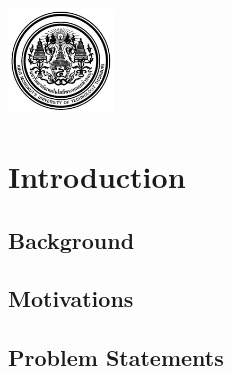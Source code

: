 \documentclass[12pt,oneside,openright,a4paper]{explo-english-project}
\begin{document}
\pdfstringdefDisableCommands{%
\let\MakeUppercase\relax
}
\begin{center}
  \includegraphics[width=2.8cm]{./assets/unilogo.jpg}
\end{center}
\vspace*{-1cm}

\maketitlepage





\tableofcontents   

\listoftables

\listoffigures                      










\chapter{Introduction}


\section{Background} 


\section{Motivations}


\section{Problem Statements}

\end{document}
